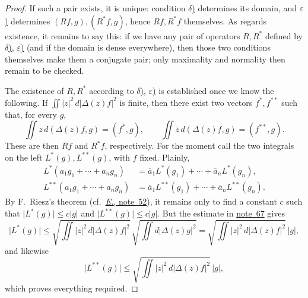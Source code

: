 \documentclass[
  paper=b5,
  twoside=true,
  fontsize=13pt,
  headings=normal,
  bookmarkpackage=false
]{scrartcl}
\theoremstyle{definition}
\newcommand{\NoteRef}[1]{\hyperref[fn:#1]{note~#1}}
\newcommand{\ErefText}[1]{\href{https://doi.org/10.1007/BF01782338}{#1}}
\begin{document}
\begin{proof}
If such a pair exists, it is unique: condition \hyperref[thm:17:delta]{\(\delta\))} determines
its domain, and \hyperref[thm:17:epsilon]{\(\varepsilon\))} determines
\((Rf,g),(R^*f,g)\), hence \(Rf,R^*f\) themselves.  As regards
existence, it remains to say this: if we have any pair of operators
\(R,R^*\) defined by \hyperref[thm:17:delta]{\(\delta\))}, \hyperref[thm:17:epsilon]{\(\varepsilon\))} (and if the domain is
dense everywhere), then those two conditions themselves make them a
conjugate pair; only maximality and normality then remain to be checked.

The existence of \(R,R^*\) according to \hyperref[thm:17:delta]{\(\delta\))},
\hyperref[thm:17:epsilon]{\(\varepsilon\))} is established once we know the following.  If
\(\iint|z|^2\,d|\Delta(z)f|^2\) is finite, then there exist two vectors
\(f^*,f^{**}\) such that, for
every \(g\),
\[
  \iint z\,d(\Delta(z)f,g)=(f^*,g),
  \qquad
  \iint\overline z\,d(\Delta(z)f,g)=(f^{**},g).
\]
These are then \(Rf\) and \(R^*f\), respectively.  For the moment call
the two integrals on the left \(L^*(g),L^{**}(g)\), with \(f\) fixed.
Plainly,
\begin{align*}
  L^*(a_1g_1+\cdots+a_ng_n)
  &=\overline a_1L^*(g_1)+\cdots+\overline a_nL^*(g_n),\\
  L^{**}(a_1g_1+\cdots+a_ng_n)
  &=\overline a_1L^{**}(g_1)+\cdots+\overline a_nL^{**}(g_n).
\end{align*}
By F.~Riesz's theorem (cf.\ \ErefText{\emph{E.}, note~52}), it remains
only to find a constant \(c\) such that \(\lvert L^{*}(g)\rvert\leq
c\lvert g\rvert\) and \(\lvert L^{**}(g)\rvert\leq c\lvert g\rvert\).
But the estimate in \NoteRef{67} gives
\[
  \lvert L^{*}(g)\rvert
  \leq
  \sqrt{\iint \lvert z\rvert^{2}\,d\lvert\Delta(z)f\rvert^{2}}\,
  \sqrt{\iint d\lvert\Delta(z)g\rvert^{2}}
  =
  \sqrt{\iint \lvert z\rvert^{2}\,d\lvert\Delta(z)f\rvert^{2}}\,\lvert g\rvert ,
\]
and likewise
\[
  \lvert L^{**}(g)\rvert
  \leq
  \sqrt{\iint \lvert z\rvert^{2}\,d\lvert\Delta(z)f\rvert^{2}}\,\lvert g\rvert ,
\]
which proves everything required.


\end{proof}
\end{document}
